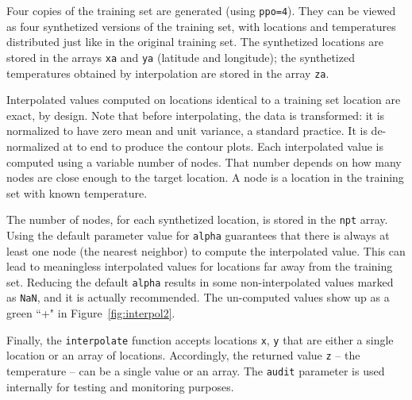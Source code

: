 \documentclass[oneside,10pt]{book}
\begin{document}
Four copies of the training set are generated (using \texttt{ppo=4}). They can be viewed as four synthetized versions of the training set, with locations and temperatures
distributed just like in
 the original training set. The synthetized locations are stored in the arrays \texttt{xa} and \texttt{ya} (latitude and longitude); the synthetized temperatures obtained by interpolation are stored in the array \texttt{za}.

Interpolated values computed on locations identical to a training set location are exact, by design. Note that before interpolating, the data is transformed: it is normalized to have zero mean and unit variance, a standard practice. It is de-normalized at to end to produce the contour plots. Each interpolated value is computed using a variable number of nodes. That number depends on how many nodes  are close enough to the target location. A node is a location in the training set with known temperature.

The number of nodes, for each synthetized location, is stored in the \texttt{npt} array. Using the default parameter value for \texttt{alpha} guarantees that there is always at least one node (the nearest neighbor) to compute the interpolated value. This can lead to meaningless interpolated values for locations far away from the training set. Reducing the default \texttt{alpha} results in some non-interpolated values marked as \texttt{NaN}, and it is actually recommended. The un-computed values show up as a green ``+" in Figure~\ref{fig:interpol2}.

Finally, the \texttt{interpolate} function accepts locations \texttt{x}, \texttt{y} that are either a single location or an array of locations. Accordingly, the returned value \texttt{z} -- the temperature -- can be a single value or an array.  The \texttt{audit} parameter is used internally for testing and monitoring purposes.
\vspace{1ex}
\end{document}
